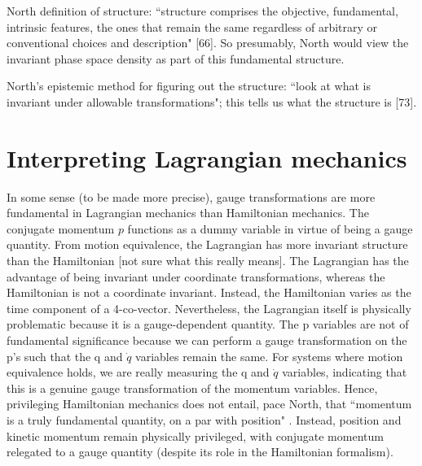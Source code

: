 \documentclass[letterpaper]{article}
\begin{document}
North definition of structure: ``structure comprises the objective, fundamental, intrinsic features, the ones that remain the same regardless of arbitrary or conventional choices and description" [66]. So presumably, North would view the invariant phase space density as part of this fundamental structure.

North's epistemic method for figuring out the structure: ``look at what is invariant under allowable transformations"; this tells us what the structure is [73].

\section{Interpreting Lagrangian mechanics}



In some sense (to be made more precise), gauge transformations are more fundamental in Lagrangian mechanics than Hamiltonian mechanics. The conjugate momentum $p $ functions as a dummy variable in virtue of being a gauge quantity. From motion equivalence, the Lagrangian has more invariant structure than the Hamiltonian [not sure what this really means]. The Lagrangian has the advantage of being invariant under coordinate transformations, whereas the Hamiltonian is not a coordinate invariant. Instead, the Hamiltonian varies as the time component of a 4-co-vector. Nevertheless, the Lagrangian itself is physically problematic because it is a gauge-dependent quantity. The p variables are not of fundamental significance because we can perform a gauge transformation on the p's such that the q and $\dot{q} $ variables remain the same. For systems where motion equivalence holds, we are really measuring the q and $\dot{q} $ variables, indicating that this is a genuine gauge transformation of the momentum variables. Hence, privileging Hamiltonian mechanics does not entail, pace North, that ``momentum is a truly fundamental quantity, on a par with position" \parencites*[77]{North2009}. Instead, position and kinetic momentum remain physically privileged, with conjugate momentum relegated to a gauge quantity (despite its role in the Hamiltonian formalism).
\end{document}
